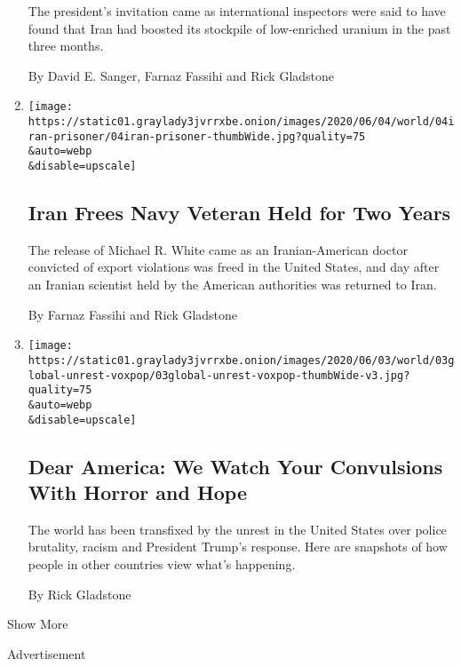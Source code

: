\begin{enumerate}
  The president's invitation came as international inspectors were said
  to have found that Iran had boosted its stockpile of low-enriched
  uranium in the past three months.

  By David E. Sanger, Farnaz Fassihi and Rick Gladstone
\item
  \href{/2020/06/04/world/middleeast/Iran-prisoner-michael-white.html}{}

  \texttt{[image: https://static01.graylady3jvrrxbe.onion/images/2020/06/04/world/04iran-prisoner/04iran-prisoner-thumbWide.jpg?quality=75\\\&auto=webp\\\&disable=upscale]}

  \hypertarget{iran-frees-navy-veteran-held-for-two-years}{%
  \subsection{Iran Frees Navy Veteran Held for Two
  Years}\label{iran-frees-navy-veteran-held-for-two-years}}

  The release of Michael R. White came as an Iranian-American doctor
  convicted of export violations was freed in the United States, and day
  after an Iranian scientist held by the American authorities was
  returned to Iran.

  By Farnaz Fassihi and Rick Gladstone
\item
  \href{/2020/06/03/world/americas/global-protests-george-floyd.html}{}

  \texttt{[image: https://static01.graylady3jvrrxbe.onion/images/2020/06/03/world/03global-unrest-voxpop/03global-unrest-voxpop-thumbWide-v3.jpg?quality=75\\\&auto=webp\\\&disable=upscale]}

  \hypertarget{dear-america-we-watch-your-convulsions-with-horror-and-hope}{%
  \subsection{Dear America: We Watch Your Convulsions With Horror and
  Hope}\label{dear-america-we-watch-your-convulsions-with-horror-and-hope}}

  The world has been transfixed by the unrest in the United States over
  police brutality, racism and President Trump's response. Here are
  snapshots of how people in other countries view what's happening.

  By Rick Gladstone
\end{enumerate}

Show More

Advertisement

